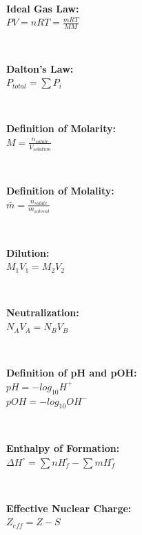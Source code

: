 \\ \begin{minipage}{\textwidth}
    \textbf{Ideal Gas Law:}
    \\ \( PV = nRT = \displaystyle\frac{ mRT }{ MM } \)
\end{minipage}
\\ \begin{minipage}{\textwidth}
    \textbf{Dalton's Law:}
    \\ \( P_{total} = \displaystyle\sum{ P_i } \)
\end{minipage}
\\ \begin{minipage}{\textwidth}
    \textbf{Definition of Molarity:}
    \\ \( M = \displaystyle\frac{ n_{solute} }{ V_{solution} } \)
\end{minipage}
\\ \begin{minipage}{\textwidth}
    \textbf{Definition of Molality:}
    \\ \( \bar{ m } = \displaystyle\frac{ n_{solute} }{ m_{solvent} } \)
\end{minipage}
\\ \begin{minipage}{\textwidth}
\textbf{Dilution:}
    \\ \( M_1 V_1 = M_2 V_2 \)
\end{minipage}
\\ \begin{minipage}{\textwidth}
    \textbf{Neutralization:}
    \\ \( N_A V_A = N_B V_B \)
\end{minipage}
\\ \begin{minipage}{\textwidth}
    \textbf{Definition of pH and pOH:}
    \\ \( pH = -log_{10}{ H^+ } \)
    \\ \( pOH = -log_{10}{ OH^- } \)
\end{minipage}
\\ \begin{minipage}{\textwidth}
    \textbf{Enthalpy of Formation:}
    \\ \( \Delta H^{\circ} = \displaystyle\sum{ n H^{\circ}_f } - \displaystyle\sum{ m H^{\circ}_f } \)
\end{minipage}
\\ \begin{minipage}{\textwidth}
    \textbf{Effective Nuclear Charge:}
    \\ \( Z_{eff} = Z - S \)
\end{minipage}
